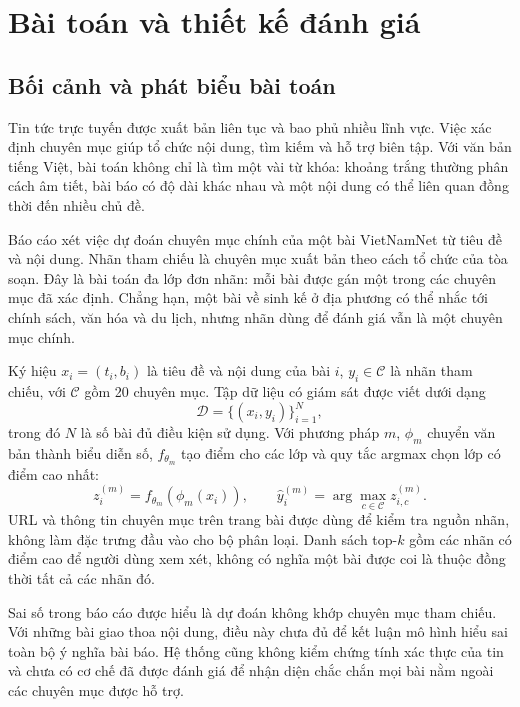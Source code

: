 \chapter{Bài toán và thiết kế đánh giá}\label{chap:problem}
\FloatBarrier
\section{Bối cảnh và phát biểu bài toán}
Tin tức trực tuyến được xuất bản liên tục và bao phủ nhiều lĩnh vực. Việc xác định chuyên mục giúp tổ chức nội dung, tìm kiếm và hỗ trợ biên tập. Với văn bản tiếng Việt, bài toán không chỉ là tìm một vài từ khóa: khoảng trắng thường phân cách âm tiết, bài báo có độ dài khác nhau và một nội dung có thể liên quan đồng thời đến nhiều chủ đề.

Báo cáo xét việc dự đoán chuyên mục chính của một bài VietNamNet từ tiêu đề và nội dung. Nhãn tham chiếu là chuyên mục xuất bản theo cách tổ chức của tòa soạn. Đây là bài toán đa lớp đơn nhãn: mỗi bài được gán một trong các chuyên mục đã xác định. Chẳng hạn, một bài về sinh kế ở địa phương có thể nhắc tới chính sách, văn hóa và du lịch, nhưng nhãn dùng để đánh giá vẫn là một chuyên mục chính.

Ký hiệu $x_i=(t_i,b_i)$ là tiêu đề và nội dung của bài $i$, $y_i\in\mathcal C$ là nhãn tham chiếu, với $\mathcal C$ gồm 20 chuyên mục. Tập dữ liệu có giám sát được viết dưới dạng
\begin{equation}\mathcal D=\{(x_i,y_i)\}_{i=1}^{N},\end{equation}
trong đó $N$ là số bài đủ điều kiện sử dụng. Với phương pháp $m$, $\phi_m$ chuyển văn bản thành biểu diễn số, $f_{\theta_m}$ tạo điểm cho các lớp và quy tắc argmax chọn lớp có điểm cao nhất:
\begin{equation}
z_i^{(m)}=f_{\theta_m}(\phi_m(x_i)),\qquad
\hat y_i^{(m)}=\arg\max_{c\in\mathcal C}z_{i,c}^{(m)}.
\end{equation}
URL và thông tin chuyên mục trên trang bài được dùng để kiểm tra nguồn nhãn, không làm đặc trưng đầu vào cho bộ phân loại. Danh sách top-$k$ gồm các nhãn có điểm cao để người dùng xem xét, không có nghĩa một bài được coi là thuộc đồng thời tất cả các nhãn đó.

Sai số trong báo cáo được hiểu là dự đoán không khớp chuyên mục tham chiếu. Với những bài giao thoa nội dung, điều này chưa đủ để kết luận mô hình hiểu sai toàn bộ ý nghĩa bài báo. Hệ thống cũng không kiểm chứng tính xác thực của tin và chưa có cơ chế đã được đánh giá để nhận diện chắc chắn mọi bài nằm ngoài các chuyên mục được hỗ trợ.

